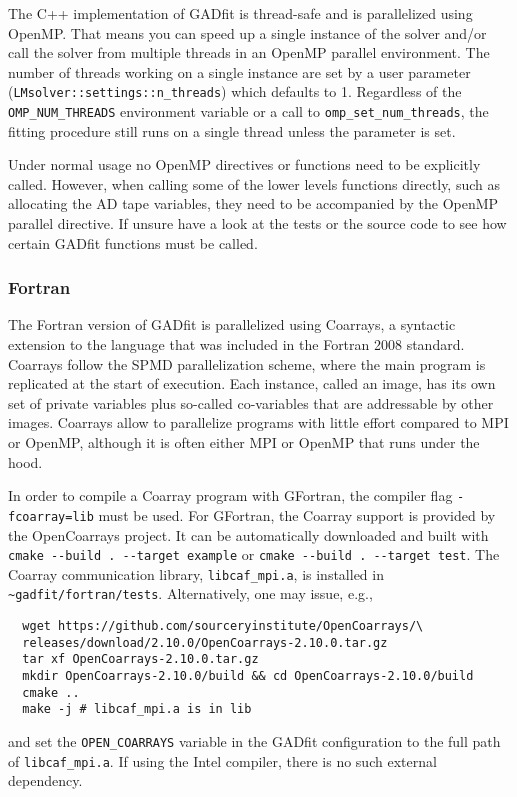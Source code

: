 \documentclass{article}
\begin{document}
The C++ implementation of GADfit is thread-safe and is parallelized using OpenMP. That means you can speed up a single instance of the solver and/or call the solver from multiple threads in an OpenMP parallel environment. The number of threads working on a single instance are set by a user parameter (\verb+LMsolver::settings::n_threads+) which defaults to 1. Regardless of the \verb+OMP_NUM_THREADS+ environment variable or a call to \verb+omp_set_num_threads+, the fitting procedure still runs on a single thread unless the parameter is set.

Under normal usage no OpenMP directives or functions need to be explicitly called. However, when calling some of the lower levels functions directly, such as allocating the AD tape variables, they need to be accompanied by the OpenMP parallel directive. If unsure have a look at the tests or the source code to see how certain GADfit functions must be called.

\subsubsection{\label{sec:parallelism_fortran}Fortran}

The Fortran version of GADfit is parallelized using Coarrays, a syntactic extension to the language that was included in the Fortran 2008 standard. Coarrays follow the SPMD parallelization scheme, where the main program is replicated at the start of execution. Each instance, called an image, has its own set of private variables plus so-called co-variables that are addressable by other images. Coarrays allow to parallelize programs with little effort compared to MPI or OpenMP, although it is often either MPI or OpenMP that runs under the hood.

In order to compile a Coarray program with GFortran, the compiler flag \texttt{-fcoarray=lib} must be used. For GFortran, the Coarray support is provided by the OpenCoarrays project. It can be automatically downloaded and built with \verb+cmake --build . --target example+ or \verb+cmake --build . --target test+. The Coarray communication library, \verb+libcaf_mpi.a+, is installed in \\
\verb+~gadfit/fortran/tests+. Alternatively, one may issue, e.g.,
\begin{verbatim}
  wget https://github.com/sourceryinstitute/OpenCoarrays/\
  releases/download/2.10.0/OpenCoarrays-2.10.0.tar.gz
  tar xf OpenCoarrays-2.10.0.tar.gz
  mkdir OpenCoarrays-2.10.0/build && cd OpenCoarrays-2.10.0/build
  cmake ..
  make -j # libcaf_mpi.a is in lib
\end{verbatim}
and set the \verb+OPEN_COARRAYS+ variable in the GADfit configuration to the full path of \verb+libcaf_mpi.a+. If using the Intel compiler, there is no such external dependency.
\end{document}
